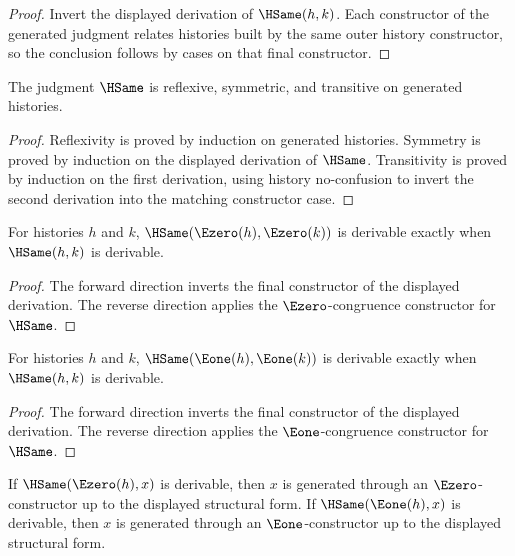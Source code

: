 \begin{proof}
Invert the displayed derivation of \(\HSame(h,k)\). Each constructor of the generated judgment relates histories built by the same outer history constructor, so the conclusion follows by cases on that final constructor.
\end{proof}

\begin{theorem}
The judgment \(\HSame\) is reflexive, symmetric, and transitive on generated histories.
\end{theorem}
\begin{proof}
Reflexivity is proved by induction on generated histories. Symmetry is proved by induction on the displayed derivation of \(\HSame\). Transitivity is proved by induction on the first derivation, using history no-confusion to invert the second derivation into the matching constructor case.
\end{proof}

\begin{corollary}
\label{cor:ezero-constructor-inversion}
For histories \(h\) and \(k\), \(\HSame(\Ezero(h),\Ezero(k))\) is derivable exactly when \(\HSame(h,k)\) is derivable.
\end{corollary}

\begin{proof}
The forward direction inverts the final constructor of the displayed derivation. The reverse direction applies the \(\Ezero\)-congruence constructor for \(\HSame\).
\end{proof}

\begin{corollary}
\label{cor:eone-constructor-inversion}
For histories $h$ and $k$, $\HSame(\Eone(h),\Eone(k))$ is derivable exactly when $\HSame(h,k)$ is derivable.
\end{corollary}

\begin{proof}
The forward direction inverts the final constructor of the displayed derivation. The reverse direction applies the $\Eone$-congruence constructor for $\HSame$.
\end{proof}

\begin{corollary}
\label{cor:constructor-inversion}
If \(\HSame(\Ezero(h),x)\) is derivable, then \(x\) is generated through an \(\Ezero\)-constructor up to the displayed structural form. If \(\HSame(\Eone(h),x)\) is derivable, then \(x\) is generated through an \(\Eone\)-constructor up to the displayed structural form.
\end{corollary}

